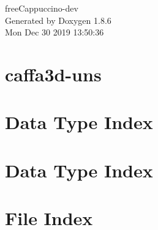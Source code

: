 \documentclass[twoside]{book}
\newcommand{\clearemptydoublepage}{%
  \newpage{\pagestyle{empty}\cleardoublepage}%
}
\begin{document}
\hypersetup{pageanchor=false}
\begin{titlepage}
\vspace*{7cm}
\begin{center}%
{\Large free\-Cappuccino-\/dev }\\
\vspace*{1cm}
{\large Generated by Doxygen 1.8.6}\\
\vspace*{0.5cm}
{\small Mon Dec 30 2019 13:50:36}\\
\end{center}
\end{titlepage}
\clearemptydoublepage
\tableofcontents
\clearemptydoublepage
{}
\hypersetup{pageanchor=true}

\chapter{caffa3d-\/uns}
\label{md_src-par_README}
\hypertarget{md_src-par_README}{}

\chapter{Data Type Index}

\chapter{Data Type Index}

\chapter{File Index}

\end{document}
